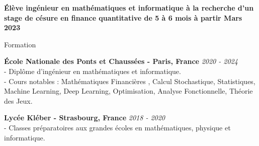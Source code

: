 \documentclass{resume} %
\begin{document}
\begin{center}
    \textbf{\Large{\'Elève ingénieur en mathématiques et informatique à la recherche d'un stage de césure en finance quantitative de 5 à 6 mois à partir Mars 2023}}
\end{center}



\begin{rSection}{Formation}

{\bf \'Ecole Nationale des Ponts et Chaussées - Paris, France} \hfill {\em 2020 - 2024} 
\\- Diplôme d'ingénieur en mathématiques et informatique. \hfill 
\\- Cours notables : Mathématiques Financières , Calcul Stochastique, Statistiques, Machine Learning, Deep Learning, Optimisation, Analyse Fonctionnelle, Théorie des Jeux.

{\bf Lycée Kléber - Strasbourg, France} \hfill {\em 2018 - 2020} 
\\- Classes préparatoires aux grandes écoles en mathématiques, physique et informatique. \hfill 

\end{rSection}
\end{document}
